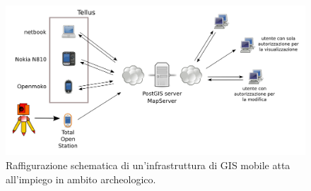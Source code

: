 	\begin{center}
		\begin{figure}
			\centering
			\includegraphics[scale=0.6]{img/tellus/schema_tellus}
			\caption{\label{fig:schema_tellus}{\small Raffigurazione schematica di un'infrastruttura di GIS mobile atta all'impiego in ambito archeologico.}}
		\end{figure}
	\end{center}
